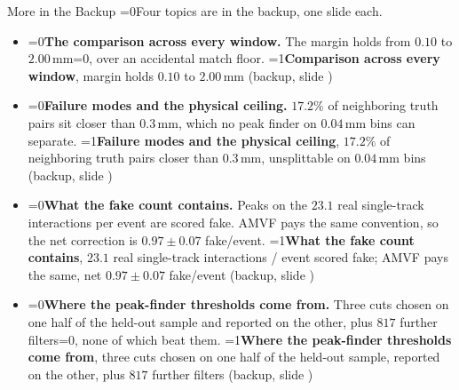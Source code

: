 \documentclass[xcolor=table,aspectratio=169]{beamer}
\providecommand{\talkbuild}{0}
\newcommand{\readingonly}[1]{\ifnum\talkbuild=0\relax#1\fi}
\newcommand{\talkonly}[1]{\ifnum\talkbuild=1\relax#1\fi}
\begin{document}
\begin{frame}{More in the Backup}
    \vspace{0.3em}
    \small
    \readingonly{Four topics are in the backup, one slide each.}
    \vspace{0.9em}

    \begin{itemize}\setlength\itemsep{0.85em}
        \item \readingonly{\textbf{The comparison across every window.} The margin holds from $0.10$
            to $2.00$\,mm\readingonly{, over an accidental match floor}.}%
            \talkonly{\textbf{Comparison across every window}, margin holds $0.10$ to
            $2.00$\,mm}
            \textcolor{black!55}{(backup, slide \pageref{bk:window})}
        \item \readingonly{\textbf{Failure modes and the physical ceiling.} $17.2\%$ of neighboring
            truth pairs sit closer than $0.3$\,mm, which no peak finder on $0.04$\,mm
            bins can separate.}%
            \talkonly{\textbf{Failure modes and the physical ceiling}, $17.2\%$ of
            neighboring truth pairs closer than $0.3$\,mm, unsplittable on $0.04$\,mm
            bins}
            \textcolor{black!55}{(backup, slide \pageref{bk:failure})}
        \item \readingonly{\textbf{What the fake count contains.} Peaks on the $23.1$ real
            single-track interactions per event are scored fake. AMVF pays the same
            convention, so the net correction is $0.97 \pm 0.07$ fake/event.}%
            \talkonly{\textbf{What the fake count contains}, $23.1$ real single-track
            interactions / event scored fake; AMVF pays the same, net
            $0.97 \pm 0.07$ fake/event}
            \textcolor{black!55}{(backup, slide \pageref{bk:fakes})}
        \item \readingonly{\textbf{Where the peak-finder thresholds come from.} Three cuts chosen on
            one half of the held-out sample and reported on the other, plus $817$
            further filters\readingonly{, none of which beat them}.}%
            \talkonly{\textbf{Where the peak-finder thresholds come from}, three cuts
            chosen on one half of the held-out sample, reported on the other, plus
            $817$ further filters}
            \textcolor{black!55}{(backup, slide \pageref{bk:thresholds})}
    \end{itemize}
\end{frame}


\end{document}

